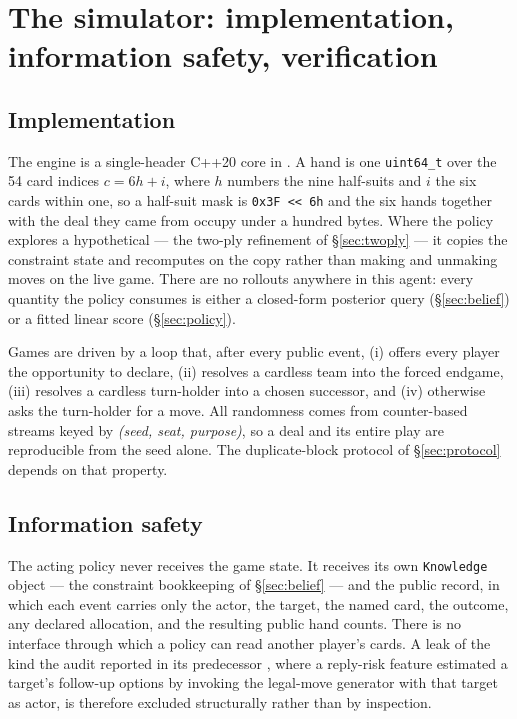 \section{The simulator: implementation, information safety, verification}
\label{sec:engine}

\subsection{Implementation}

The engine is a single-header C++20 core in . A hand is one
\verb|uint64_t| over the 54 card indices $c = 6h + i$, where $h$ numbers the nine
half-suits and $i$ the six cards within one, so a half-suit mask is
\verb|0x3F << 6h| and the six hands together with the deal they came from occupy
under a hundred bytes. Where the policy explores a hypothetical --- the two-ply
refinement of \S\ref{sec:twoply} --- it copies the constraint state and
recomputes on the copy rather than making and unmaking moves on the live game.
There are no rollouts anywhere in this agent: every quantity the policy consumes
is either a closed-form posterior query (\S\ref{sec:belief}) or a fitted linear
score (\S\ref{sec:policy}).

Games are driven by a loop that, after every public event, (i) offers every
player the opportunity to declare, (ii) resolves a cardless team into the forced
endgame, (iii) resolves a cardless turn-holder into a chosen successor, and
(iv) otherwise asks the turn-holder for a move. All randomness comes from
counter-based streams keyed by \emph{(seed, seat, purpose)}, so a deal and its
entire play are reproducible from the seed alone. The duplicate-block protocol
of \S\ref{sec:protocol} depends on that property.

\subsection{Information safety}

The acting policy never receives the game state. It receives its own
\texttt{Knowledge} object --- the constraint bookkeeping of
\S\ref{sec:belief} --- and the public record, in which each event carries only
the actor, the target, the named card, the outcome, any declared allocation, and
the resulting public hand counts. There is no interface through which a policy
can read another player's cards. A leak of the kind the \vthree{} audit reported
in its predecessor \cite{fishbot03}, where a reply-risk feature estimated a
target's follow-up options by invoking the legal-move generator with that target
as actor, is therefore excluded structurally rather than by inspection.

